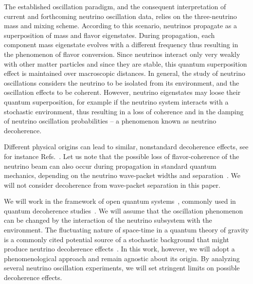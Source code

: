 \documentclass[aps, prd, onecolumn, tightenlines, notitlepage, superscriptaddress, nofootinbib, preprintnumbers, floatfix,showkeys,11pt]{revtex4-2}
\begin{document}
The established oscillation paradigm, and the consequent interpretation of current and forthcoming neutrino oscillation data, relies on the three-neutrino mass and mixing scheme. According to this scenario,
neutrinos propagate as a superposition of mass and flavor eigenstates. During propagation, each component mass eigenstate evolves with a different frequency thus resulting in the phenomenon of flavor conversion.
%
Since neutrinos interact only very weakly with other matter particles and since they are stable, this quantum superposition effect is maintained over macroscopic distances. In general, the study of neutrino oscillations considers the neutrino to be isolated from its environment, and the oscillation effects to be coherent. However, neutrino eigenstates may loose their quantum superposition, for example if the neutrino system interacts with a stochastic environment, thus resulting in a loss of coherence and in the damping of neutrino oscillation probabilities -- a phenomenon known as neutrino decoherence.

Different physical origins can lead to similar, nonstandard decoherence effects, see for instance Refs.~\cite{Kiers:1995zj,Ohlsson:2000mj,Beuthe:2001rc,Beuthe:2002ej,Giunti:2003ax,Blennow:2005yk,Farzan:2008eg,Kayser:2010pr,Jones:2014sfa,Akhmedov:2019iyt,Grimus:2019hlq,Naumov:2020yyv,Akhmedov:2022bjs,Krueger:2023skk}. Let us note that the possible loss of flavor-coherence of the neutrino beam can also occur during propagation in standard quantum mechanics, depending on the neutrino wave-packet widths and separation~\cite{Giunti:1991sx,Beuthe:2002ej,Kayser:2010pr,Naumov:2013uia,deGouvea:2020hfl,deGouvea:2021uvg}. We will not consider decoherence from wave-packet separation in this paper.

We will work in the framework of open quantum systems~\cite{Breuer:2002pc}, commonly used in quantum decoherence studies~\cite{Gago:2000qc,Benatti:2000ph,Lisi:2000zt,Benatti:2001fa, Morgan:2004vv,Anchordoqui:2005gj,Fogli:2007tx,Farzan:2008zv, Oliveira:2013nua, Oliveira:2016asf, Jones:2014sfa,  BalieiroGomes:2016ykp, Coelho:2017zes, Coelho:2017byq, Carpio:2017nui,   Coloma:2018idr, Carpio:2018gum, Carrasco:2018sca, Buoninfante:2020iyr, Gomes:2020muc, Ohlsson:2020gxx,Stuttard:2020qfv,Stuttard:2021uyw,Banerjee:2022slh}. We will assume that the oscillation phenomenon can be changed by the interaction of the neutrino subsystem with the environment. 
%
The fluctuating nature of space-time in a quantum theory of gravity is a commonly cited potential source of a stochastic background that might produce neutrino decoherence effects~\cite{Hawking:1976ra,Ellis:1983jz,Giddings:1988cx,Addazi:2021xuf}.
%
In this work, however, we will adopt a phenomenological approach and remain agnostic about its origin. By analyzing several neutrino oscillation experiments, we will set stringent limits on possible decoherence effects.
\end{document}
